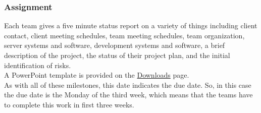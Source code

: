\documentclass[11pt,a4paper,oneside]{article}
\begin{document}
\subsubsection{Assignment}
Each team gives a five minute status report on a variety of things including client contact, client meeting schedules, team meeting schedules, team organization, server systems and software, development systems and software, a brief description of the project, the status of their project plan, and the initial identification of risks.\\

A PowerPoint template is provided on the \href {http://www.cse.msu.edu/~cse498/2012-01/other-links/downloads}{Downloads} page.\\

As with all of these milestones, this date indicates the due date. So, in this case the due date is the Monday of the third week, which means that the teams have to complete this work in first three weeks.\\
\end{document}
